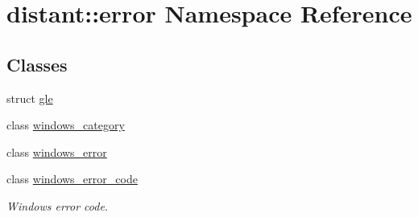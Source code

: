 \hypertarget{namespacedistant_1_1error}{}\section{distant\+:\+:error Namespace Reference}
\label{namespacedistant_1_1error}
\subsection*{Classes}
\begin{DoxyCompactItemize}
\item 
struct \mbox{\hyperlink{structdistant_1_1error_1_1gle}{gle}}
\item 
class \mbox{\hyperlink{classdistant_1_1error_1_1windows__category}{windows\+\_\+category}}
\item 
class \mbox{\hyperlink{classdistant_1_1error_1_1windows__error}{windows\+\_\+error}}
\item 
class \mbox{\hyperlink{classdistant_1_1error_1_1windows__error__code}{windows\+\_\+error\+\_\+code}}
\begin{DoxyCompactList}\small\item\em Windows error code. \end{DoxyCompactList}\end{DoxyCompactItemize}
